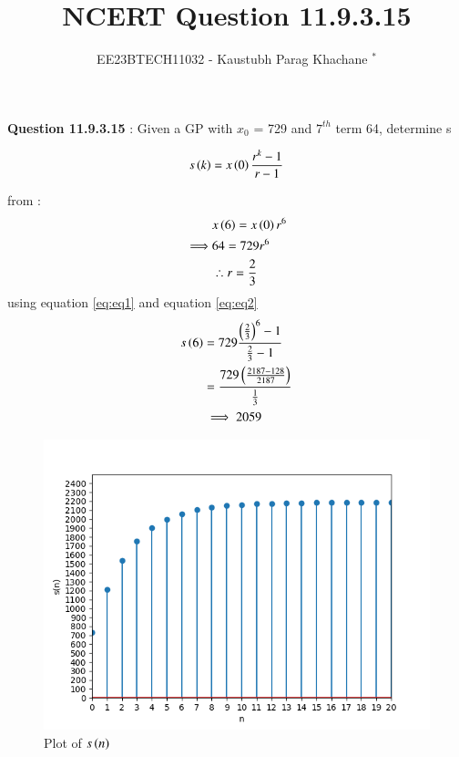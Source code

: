 \documentclass[journal,12pt,twocolumn]{IEEEtran}
\theoremstyle{remark}
\begin{document}

\vspace{3cm}

\Large\title{NCERT Question 11.9.3.15}
\large\author{EE23BTECH11032 - Kaustubh Parag Khachane $^{*}$%
}
\maketitle
\newpage
\bigskip

\renewcommand{\thefigure}{\theenumi}
\renewcommand{\thetable}{\theenumi}
\large\textbf{Question 11.9.3.15} : Given a GP with $x_0$ = 729 and \(7^{th}\) term 64, determine s

\solution


\begin{align}
    s\left(k\right) = x\left(0\right)\frac{r^k -1}{r-1} \label{eq:eq1}
\end{align}

from  :
\begin{align}
    &x\left(6\right) = x\left(0\right)r^6\\
    \implies &64 = 729r^6\\
    &\therefore r = \frac{2}{3}\label{eq:eq2}
\end{align}
    using equation \eqref{eq:eq1} and equation \eqref{eq:eq2}
\begin{align}
    s\left(6\right) &= 729\frac{\left(\frac{2}{3}\right)^6 - 1}{\frac{2}{3} - 1}\\
  & = \frac{729\left(\frac{2187 - 128}{2187}\right)}{\frac{1}{3}}\\
  &\implies 2059\notag
\end{align}
\begin{figure}[!ht]
\centering
\begin{center}
\includegraphics[width=\columnwidth]{Figure_1}
\caption{Plot of $s\left(n\right)$}
\end{center}
\end{figure}
\end{document}
